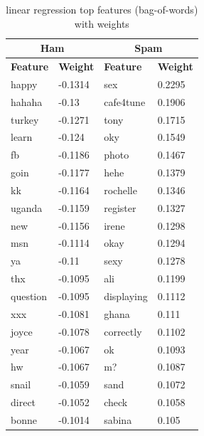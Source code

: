 \documentclass[preprint]{acm_proc_article-sp}
\begin{document}
\begin{table}
\begin{tabular}{l|l||l|l}
\multicolumn{2}{c}{\textbf{Ham}} & 
\multicolumn{2}{c}{\textbf{Spam}} \\
\hline
\textbf{Feature} & \textbf{Weight} & \textbf{Feature} & \textbf{Weight} \\
\hline
happy & -0.1314 & sex & 0.2295\\
hahaha & -0.13 & cafe4tune & 0.1906\\
turkey & -0.1271 & tony & 0.1715\\
learn & -0.124 & oky & 0.1549\\
fb & -0.1186 & photo & 0.1467\\
goin & -0.1177 & hehe & 0.1379\\
kk & -0.1164 & rochelle & 0.1346\\
uganda & -0.1159 & register & 0.1327\\
new & -0.1156 & irene & 0.1298\\
msn & -0.1114 & okay & 0.1294\\
ya & -0.11 & sexy & 0.1278\\
thx & -0.1095 & ali & 0.1199\\
question & -0.1095 & displaying & 0.1112\\
xxx & -0.1081 & ghana & 0.111\\
joyce & -0.1078 & correctly & 0.1102\\
year & -0.1067 & ok & 0.1093\\
hw & -0.1067 & m? & 0.1087\\
snail & -0.1059 & sand & 0.1072\\
direct & -0.1052 & check & 0.1058\\
bonne & -0.1014 & sabina & 0.105\\
\end{tabular}
\caption{linear regression top features (bag-of-words) with weights}
\label{tab:lrfeats}
\end{table}
\end{document}
